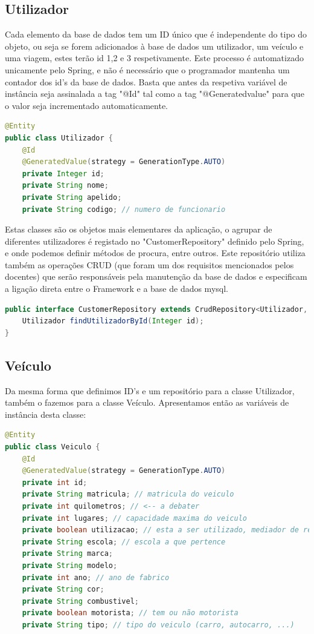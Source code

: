 \documentclass[11pt,a4paper]{report}%
\begin{document}
\subsection{Utilizador}
Cada elemento da base de dados tem um ID único que é independente do tipo do objeto, ou seja se forem adicionados à base de dados um utilizador, um veículo e uma viagem, estes terão id 1,2 e 3 respetivamente. Este processo é automatizado unicamente pelo Spring, e não é necessário que o programador mantenha um contador dos id's da base de dados. Basta que antes da respetiva variável de instância seja assinalada a tag "@Id" tal como a tag "@Generatedvalue" para que o valor seja incrementado automaticamente.
\begin{lstlisting}[language=Java, caption=Classe Utilizador]
@Entity
public class Utilizador {
    @Id
    @GeneratedValue(strategy = GenerationType.AUTO)
    private Integer id;
    private String nome;
    private String apelido;
    private String codigo; // numero de funcionario
\end{lstlisting}

Estas classes são os objetos mais elementares da aplicação, o agrupar de diferentes utilizadores é registado no "CustomerRepository" definido pelo Spring, e onde podemos definir métodos de procura, entre outros. Este repositório utiliza também as operações CRUD (que foram um dos requisitos mencionados pelos docentes) que serão responsáveis pela manutenção da base de dados e especificam a ligação direta entre o Framework e a base de dados mysql.

\begin{lstlisting}[language=Java, caption=Repositório dos Utilizadores]
public interface CustomerRepository extends CrudRepository<Utilizador, Integer> {
    Utilizador findUtilizadorById(Integer id);
}
\end{lstlisting}

\newpage
\subsection{Veículo}
Da mesma forma que definimos ID's e um repositório para a classe Utilizador, também o fazemos para a classe Veículo. Apresentamos então as variáveis de instância desta classe:

\begin{lstlisting}[language=Java, caption=Classe Veículo]
@Entity
public class Veiculo {
    @Id
    @GeneratedValue(strategy = GenerationType.AUTO)
    private int id;
    private String matricula; // matricula do veiculo
    private int quilometros; // <-- a debater
    private int lugares; // capacidade maxima do veiculo
    private boolean utilizacao; // esta a ser utilizado, mediador de reserva
    private String escola; // escola a que pertence
    private String marca;
    private String modelo;
    private int ano; // ano de fabrico
    private String cor;
    private String combustivel;
    private boolean motorista; // tem ou não motorista
    private String tipo; // tipo do veiculo (carro, autocarro, ...)

\end{lstlisting}
\end{document}
